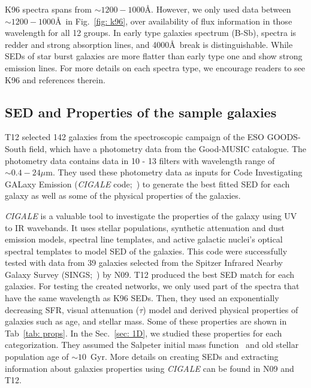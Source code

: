     K96 spectra spans from $\sim1200-1000$\AA.
    However, we only used data between $\sim1200-1000$\AA~in Fig.~\ref{fig: k96}, over availability of flux information in those wavelength for all 12 groups.
    In early type galaxies spectrum (B-Sb), spectra is redder and strong absorption lines, and 4000\AA~break is distinguishable. 
    While SEDs of star burst galaxies are more flatter than early type one and show strong emission lines.
    For more details on each spectra type, we encourage readers to see K96 and references therein. 
    

 \subsection{SED and Properties of the sample galaxies}
    T12 selected 142 galaxies from the spectroscopic campaign of the ESO GOODS-South field, which have a photometry data from the Good-MUSIC catalogue. 
    The photometry data contains data in 10 - 13 filters with wavelength range of $\sim 0.4-24 \mu$m. 
    They used these photometry data as inputs for Code Investigating GALaxy Emission ({\em CIGALE} code;~\citep{Noll09}) to generate the best fitted SED for each galaxy as well as some of the physical properties of the galaxies.
    
    {\em CIGALE} is a valuable tool to investigate the properties of the galaxy using UV to IR wavebands.
    It uses stellar populations, synthetic attenuation and dust emission models, spectral line templates, and active galactic nuclei's optical spectral templates to model SED of the galaxies.
    This code were successfully tested with data from 39 galaxies selected from the Spitzer Infrared Nearby Galaxy Survey (SINGS;~\citep{Kennicutt03}) by N09.
    T12 produced the best SED match for each galaxies.
    For testing the created networks, we only used part of the spectra that have the same wavelength as K96 SEDs.
    Then, they used an exponentially decreasing SFR, visual attenuation ($\tau$) model and derived physical properties of galaxies such as age, and stellar mass.
    Some of these properties are shown in Tab~\ref{tab: props}.
    In the Sec.~\ref{sec: 1D}, we studied these properties for each categorization.
    They assumed the Salpeter initial mass function~\citep{Salpeter55} and old stellar population age of $\sim 10$~Gyr.
    More details on creating SEDs and extracting information about galaxies properties using {\em CIGALE} can be found in N09 and T12.
    
